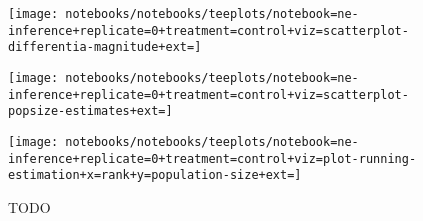 \begin{figure}
  \centering

  \begin{minipage}{.75\textwidth}
    \centering
    \texttt{[image: notebooks/notebooks/teeplots/notebook=ne-inference+replicate=0+treatment=control+viz=scatterplot-differentia-magnitude+ext=]}
  \end{minipage}%
  \begin{minipage}{.2\textwidth}
    \label{fig:ne-process-example:differentia}
  \end{minipage}

  \vspace{1em}

  \begin{minipage}{.75\textwidth}
    \centering
    \texttt{[image: notebooks/notebooks/teeplots/notebook=ne-inference+replicate=0+treatment=control+viz=scatterplot-popsize-estimates+ext=]}
  \end{minipage}%
  \begin{minipage}{.2\textwidth}
    \label{fig:ne-process-example:singleton-est}
  \end{minipage}

  \vspace{1em}

  \begin{minipage}{.75\textwidth}
    \centering
    \texttt{[image: notebooks/notebooks/teeplots/notebook=ne-inference+replicate=0+treatment=control+viz=plot-running-estimation+x=rank+y=population-size+ext=]}
  \end{minipage}%
  \begin{minipage}{.2\textwidth}
    \label{fig:ne-process-example:running-est}
  \end{minipage}

  \caption{TODO}
  \label{fig:ne-process-example}
\end{figure}


%
%


